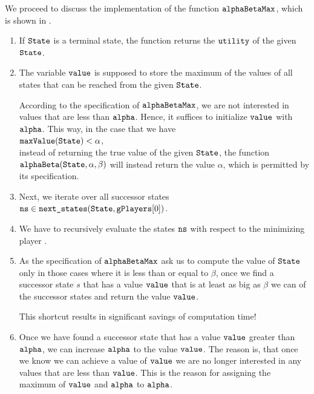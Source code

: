 \noindent
We proceed to discuss the implementation of the function $\texttt{alphaBetaMax}$, which is shown in
.
\begin{enumerate}
\item If $\texttt{State}$ is a terminal state, the function returns the $\texttt{utility}$ of the given
      $\texttt{State}$.
\item The variable $\texttt{value}$ is supposed to store the maximum of the values of all states
      that can be reached from the given $\texttt{State}$.
      
      According to the specification of $\texttt{alphaBetaMax}$,  we are not interested in values that are less than
      $\texttt{alpha}$.  Hence, it suffices to initialize $\texttt{value}$ with $\texttt{alpha}$.   This way, in the case that we have
      \\[0.2cm]
      \hspace*{1.3cm}
      $\texttt{maxValue}(\texttt{State}) < \alpha$,
      \\[0.2cm]
      instead of returning the true value of the given $\texttt{State}$, the function
      $\texttt{alphaBeta}(\texttt{State},\alpha,\beta)$ will instead return the value $\alpha$, which is permitted by its specification.
\item Next, we iterate over all successor states $\texttt{ns} \in \texttt{next\_states}(\texttt{State}, \texttt{gPlayers}[0])$.
\item We have to recursively evaluate the states $\texttt{ns}$ with respect to the minimizing player .
\item As the specification of $\texttt{alphaBetaMax}$ ask us to compute the value of $\texttt{State}$ only in
      those cases where it is less than or equal to $\beta$, once we find a successor state $s$ that has a
      value $\texttt{value}$ that is at least as big as $\beta$ we can  of the successor
      states and return the value $\texttt{value}$.

      This shortcut results in significant savings of computation time!
\item Once we have found a successor state that has a value $\texttt{value}$ greater than $\texttt{alpha}$,
      we can increase $\texttt{alpha}$ to the value $\texttt{value}$.  The reason is, that once we know we can
      achieve a value of $\texttt{value}$ we are no longer interested in any values that are less than $\texttt{value}$.
      This is the reason for assigning the maximum of $\texttt{value}$ and $\texttt{alpha}$ to $\texttt{alpha}$.
\end{enumerate}

